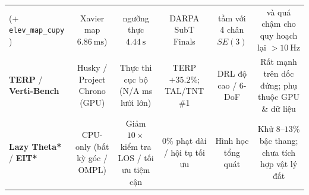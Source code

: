 \documentclass[12pt, a4paper]{article}
\begin{document}
\begin{table}[htbp]
{\begin{tabular}{lccccc}
    (+ \texttt{elev\_map\_cupy} \cite{miki2022elevation}) & Xavier map $6.86\ \text{ms}$) & ngưỡng thực $4.44\ \text{s}$ & DARPA SubT Finals & tầm với 4 chân $SE(3)$ & và quá chậm cho quy hoạch lại $>10\ \text{Hz}$ \\
    \textbf{TERP} \cite{weerakoon2022terp} / \textbf{Verti-Bench} \cite{vertibench2025} & Husky / Project Chrono (GPU) & Thực thi cục bộ (N/A ms lưới lớn) & TERP $+35.2\%$; TAL/TNT \#1 & DRL độ cao / 6-DoF & Rất mạnh trên dốc đứng; phụ thuộc GPU \& dữ liệu \\
    \textbf{Lazy Theta*} \cite{nash2010lazytheta} / \textbf{EIT*} \cite{strub2022eit} & CPU-only (bất kỳ góc / OMPL) & Giảm $10\times$ kiểm tra LOS / tối ưu tiệm cận & $0\%$ phạt dài / hội tụ tối ưu & Hình học tổng quát & Khử $8\text{--}13\%$ bậc thang; chưa tích hợp vật lý đất \\
    \bottomrule
\end{tabular}%
}
\end{table}
\end{document}
